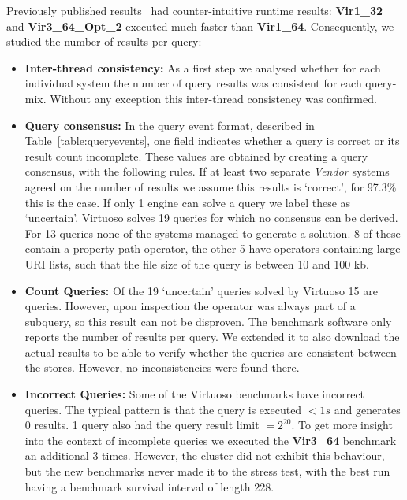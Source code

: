 Previously published results~\cite{dewitte_swat4ls_2016} had counter-intuitive runtime results:  \textbf{ Vir1\_32} and \textbf{Vir3\_64\_Opt\_2} executed much faster than \textbf{Vir1\_64}. 
Consequently, we studied the number of results per query:

 
\begin{itemize}
	\item \textbf{Inter-thread consistency:} As a first step we analysed whether for each individual system the number of query results was consistent for each query-mix. 
	Without any exception this inter-thread consistency was confirmed.
	
	\item \textbf{Query consensus:} In the query event format, described in Table~\ref{table:queryevents}, one field indicates whether a query is correct or its result count incomplete. These values are obtained by creating a query consensus, with the following rules. If at least two separate \emph{Vendor} systems agreed on the number of results we assume this results is `correct', for 97.3\% this is the case. If only 1 engine can solve a query we label these as `uncertain'. Virtuoso solves 19 queries for which no consensus can be derived. For 13 queries none of the systems managed to generate a solution. 8 of these contain a property path operator, the other 5 have  operators containing large URI lists, such that the file size of the query is between 10 and 100 kb.
	
	\item \textbf{Count Queries:} Of the 19 `uncertain' queries solved by Virtuoso 15 are  queries. However, upon inspection the  operator was always part of a subquery, so this result can not be disproven. The benchmark software only reports the number of results per query. We extended it to also download the actual results to be able to verify whether the  queries are consistent between the stores. However, no inconsistencies were found there.
	
	\item \textbf{Incorrect Queries:} Some of the Virtuoso benchmarks have incorrect queries. The typical pattern is that the query is executed $< 1s$ and generates 0 results. 1 query also had the query result limit $ = 2^{20}$. To get more insight into the context of incomplete queries we executed the \textbf{Vir3\_64} benchmark an additional 3 times. However, the cluster did not exhibit this behaviour, but the new benchmarks never made it to the stress test, with the best run having a benchmark survival interval of length 228.
\end{itemize}




